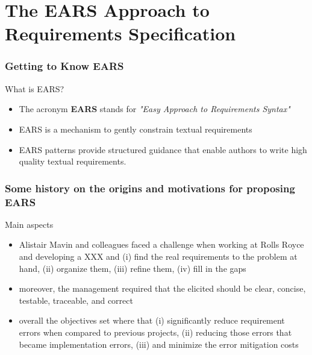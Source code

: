 \documentclass[aspectratio=169]{beamer}
\begin{document}
\frame[plain]{\titlepage}

\section*{The EARS Approach to Requirements Specification}

\begin{frame}[shrink]
  \small
  \frametitle{Getting to Know EARS}
  \begin{block}{What is EARS?}
  \begin{itemize}
    \item The acronym {\bf EARS} stands for {\it "Easy Approach to Requirements Syntax"} 
    \item EARS is a mechanism to gently constrain textual requirements
    \item EARS patterns provide structured guidance that enable authors to write high quality textual requirements.
  \end{itemize}
  \end{block}
\end{frame}

\begin{frame}
  \frametitle{Some history on the origins and motivations for proposing EARS}
  \begin{block}{Main aspects}
  \begin{itemize}
    \item Alistair Mavin and colleagues faced a challenge when working at Rolls Royce and developing a XXX and (i) find the real requirements to the problem at hand, (ii) organize them, (iii) refine them, (iv) fill in the gaps 
    \item moreover, the management required that the elicited should be clear, concise, testable, traceable, and correct
    \item overall the objectives set where that (i) significantly reduce requirement errors when compared to previous projects, (ii) reducing those errors that became implementation errors, (iii) and minimize the error mitigation costs   
  \end{itemize}
  
  \end{block}

\end{frame}
\end{document}
